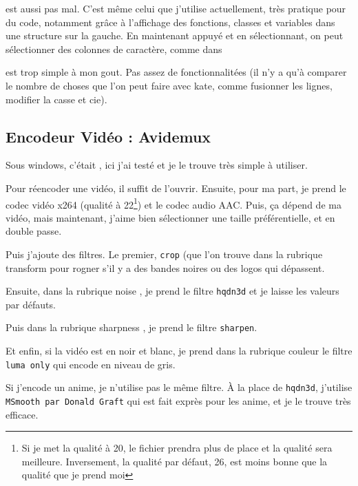\documentclass[a4paper,twoside]{article}
\begin{document}
 est aussi pas mal. C'est même celui que j'utilise actuellement, très pratique pour du code, notamment grâce à l'affichage des fonctions, classes et variables dans une structure sur la gauche. En maintenant  appuyé et en sélectionnant, on peut sélectionner des colonnes de caractère, comme dans 

 est trop simple à mon gout. Pas assez de fonctionnalitées (il n'y a qu'à comparer le nombre de choses que l'on peut faire avec kate, comme fusionner les lignes, modifier la casse et cie).

\subsection{Encodeur Vidéo : Avidemux}
Sous windows, c'était , ici j'ai testé  et je le trouve très simple à utiliser.

Pour réencoder une vidéo, il suffit de l'ouvrir. Ensuite, pour ma part, je prend le codec vidéo x264 (qualité à 22\footnote{Si je met la qualité à 20, le fichier prendra plus de place et la qualité sera meilleure. Inversement, la qualité par défaut, 26, est moins bonne que la qualité que je prend moi}) et le codec audio AAC. Puis, ça dépend de ma vidéo, mais maintenant, j'aime bien sélectionner une taille préférentielle, et en double passe.

\bigskip

Puis j'ajoute des filtres. Le premier, \texttt{crop} (que l'on trouve dans la rubrique \og transform \fg    pour rogner s'il y a des bandes noires ou des logos qui dépassent.

Ensuite, dans la rubrique \og noise \fg,  je prend le filtre \texttt{hqdn3d} et je laisse les valeurs par défauts.

Puis dans la rubrique \og sharpness \fg, je prend le filtre \texttt{sharpen}.

Et enfin, si la vidéo est en noir et blanc, je prend dans la rubrique \og couleur \fg   le filtre \texttt{luma only} qui encode en niveau de gris.

Si j'encode un anime, je n'utilise pas le même filtre. À la place de \texttt{hqdn3d}, j'utilise \texttt{MSmooth par Donald Graft} qui est fait exprès pour les anime, et je le trouve très efficace.
\end{document}
